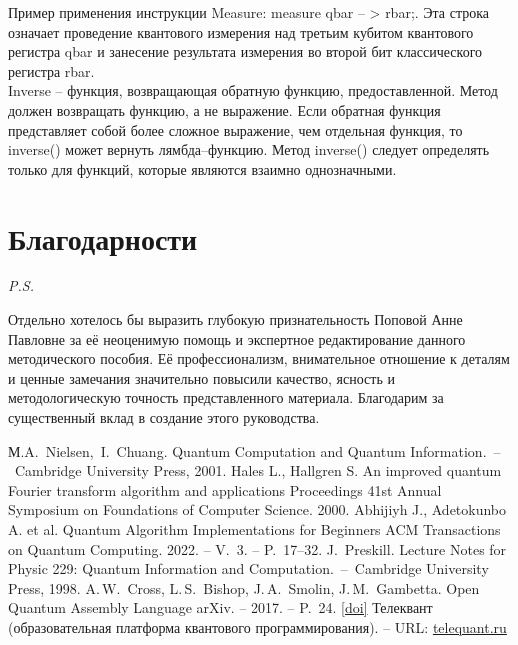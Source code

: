 \documentclass[12pt,a4paper]{article}
\begin{document}
	\indent Пример применения инструкции Measure: measure qbar -- > rbar;. Эта строка означает проведение квантового измерения над третьим кубитом квантового регистра qbar и занесение результата измерения во второй бит классического регистра rbar.\\
	\indent	Inverse -- функция, возвращающая обратную функцию, предоставленной.
	Метод должен возвращать функцию, а не выражение. Если обратная функция представляет собой более сложное выражение, чем отдельная функция, то inverse() может вернуть лямбда--функцию.
	Метод inverse() следует определять только для функций, которые являются взаимно однозначными.
	\newpage 
	\section*{Благодарности} 
	\textit{P.S.}
	
	Отдельно хотелось бы выразить глубокую признательность Поповой Анне Павловне за её неоценимую помощь и экспертное редактирование данного методического пособия. Её профессионализм, внимательное отношение к деталям и ценные замечания значительно повысили качество, ясность и методологическую точность представленного материала. Благодарим за существенный вклад в создание этого руководства.
	
	
	\newpage
	\begin{thebibliography}{99}
		\hypertarget{references}{}
		М.A.~Nielsen,~I.~Chuang. Quantum Computation and Quantum Information.~--~Cambridge University Press, 2001.  
		Hales L., Hallgren S. An improved quantum Fourier transform algorithm
		and applications  Proceedings 41st Annual Symposium on Foundations of
		Computer Science. 2000.
		Abhijiyh J., Adetokunbo A. et al. Quantum Algorithm Implementations for
		Beginners  ACM Transactions on Quantum Computing. 2022. -- V.~3. -- P.~17--32.
		J.~Preskill.
		Lecture Notes for Physic 229: Quantum Information and Computation.~--~Cambridge University Press, 1998.
		A.\,W.~Cross, L.\,S.~Bishop, J.\,A.~Smolin, J.\,M.~Gambetta.
		{
			Open Quantum Assembly Language} arXiv. -- 2017. -- P.~24.
		\href{https://doi.org/10.48550/arXiv.1707.03429}{[doi]}
		Телеквант (образовательная платформа квантового программирования). -- URL: \href{https://telequant.ru/}{telequant.ru}
	\end{thebibliography}
\end{document}
